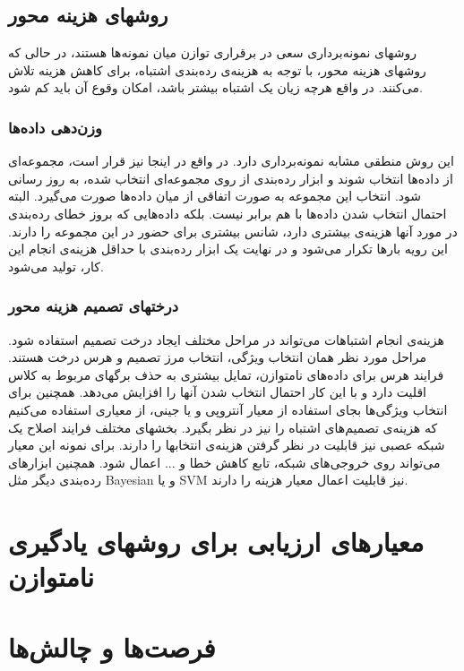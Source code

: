 \documentclass{article}
\begin{document}
\subsection{روشهای هزینه محور}
روشهای نمونه‌برداری سعی در برقراری توازن میان نمونه‌ها هستند، در حالی که روشهای هزینه محور، با توجه به هزینه‌ی رده‌بندی اشتباه، برای کاهش هزینه تلاش می‌کنند. در واقع هرچه زیان یک اشتباه بیشتر باشد، امکان وقوع آن باید کم شود.

\subsubsection{وزن‌دهی داده‌ها}
این روش منطقی مشابه نمونه‌برداری دارد. در واقع در اینجا نیز قرار است، مجموعه‌ای از داده‌ها انتخاب شوند و ابزار رده‌بندی از روی مجموعه‌ای انتخاب شده، به روز رسانی شود. انتخاب این مجموعه به صورت اتفاقی از میان داده‌ها صورت می‌گیرد. البته احتمال انتخاب شدن داده‌ها با هم برابر نیست. بلکه داده‌هایی که بروز خطای رده‌بندی در مورد آنها هزینه‌ی بیشتری دارد، شانس بیشتری برای حضور در این مجموعه را دارند. این رویه بارها تکرار می‌شود و در نهایت یک ابزار رده‌بندی با حداقل هزینه‌ی انجام این کار، تولید می‌شود.
\subsubsection{درختهای تصمیم هزینه محور}
هزینه‌ی انجام اشتباهات می‌تواند در مراحل مختلف ایجاد درخت تصمیم استفاده شود. مراحل مورد نظر همان انتخاب ویژگی، انتخاب مرز تصمیم و هرس درخت هستند. فرایند هرس برای داده‌های نامتوازن، تمایل بیشتری به حذف برگهای مربوط به کلاس اقلیت دارد و با این کار احتمال انتخاب شدن آنها را افزایش می‌دهد. همچنین برای انتخاب ویژگی‌ها بجای استفاده از معیار آنتروپی و یا جینی، از معیاری استفاده می‌کنیم که هزینه‌ی تصمیم‌های اشتباه را نیز در نظر بگیرد.
بخشهای مختلف فرایند اصلاح یک شبکه عصبی نیز قابلیت در نظر گرفتن هزینه‌ی انتخابها را دارند. برای نمونه این معیار می‌تواند روی خروجی‌های شبکه، تابع کاهش خطا و ... اعمال شود. همچنین ابزارهای رده‌بندی دیگر مثل Bayesian و یا SVM نیز قابلیت اعمال معیار هزینه را دارند.
\section{معیارهای ارزیابی برای روشهای یادگیری نامتوازن}

\section{فرصت‌ها و چالش‌ها}
\end{document}
